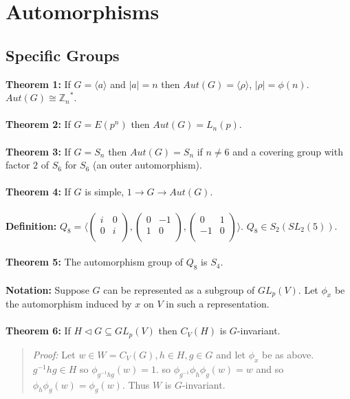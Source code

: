 \chapter{Automorphisms}
\section {Specific Groups}
{\bf Theorem 1:}
If $G= \langle a \rangle $ and $|a|=n$ then $Aut(G)= \langle \rho \rangle $, $|\rho|= \phi(n)$.
$Aut(G) \cong {{\mathbb Z}_n}^*$.
\\
\\
{\bf Theorem 2:}
If $G= E(p^n)$ then $Aut(G)= L_n(p)$.
\\
\\
{\bf Theorem 3:}
If $G= S_n$ then $Aut(G)= S_n$ if $n \ne 6$ and a covering group with factor $2$ of $S_6$ for
$S_6$ (an outer automorphism).
\\
\\
{\bf Theorem 4:}
If $G$ is simple, $1 \rightarrow G \rightarrow Aut(G)$.
\\
\\
{\bf Definition:} $Q_8 = 
\langle 
\left(\begin{array} {cc}
i & 0\\
0 & i\\
\end{array}\right),
\left(\begin{array} {cc}
0 & -1\\
1 & 0\\
\end{array}\right),
\left(\begin{array} {cc}
0 & 1\\
-1 & 0\\
\end{array}\right)
\rangle$. $Q_8 \in S_2(SL_2(5))$.
\\
\\
{\bf Theorem 5:}  The automorphism group of $Q_8$ is $S_4$.
\\
\\
{\bf Notation:} Suppose $G$ can be represented as a subgroup of $GL_p(V)$.
Let $\phi_{x}$ be the automorphism induced by $x$ on $V$ in such a representation.
\\
\\
{\bf Theorem 6:} If $H \lhd G \subseteq GL_p(V)$ then $C_V(H)$ is $G$-invariant.
\begin{quote}
\emph{Proof:}
Let $w \in W = C_V(G), h \in H, g \in G$ and let $\phi_{x}$ be as above.
$g^{-1} h g \in H$ so $\phi_{g^{-1} h g}(w) = 1$.
so $\phi_{g^{-1}} \phi_{h} \phi_{g} (w) = w$ and so $\phi_{h} \phi_{g} (w) = \phi_{g} (w)$.
Thus $W$ is $G$-invariant.
\end{quote}

